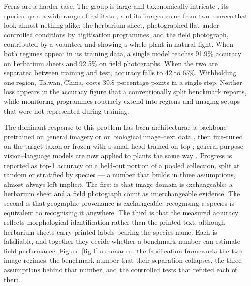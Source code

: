 \documentclass[preprint,12pt,authoryear]{elsarticle}
\begin{document}
Ferns are a harder case. The group is large and taxonomically intricate \citep{ppgi2016}, its species span a wide range of habitats \citep{page2002}, and its images come from two sources that look almost nothing alike: the herbarium sheet, photographed flat under controlled conditions by digitisation programmes, and the field photograph, contributed by a volunteer and showing a whole plant in natural light. When both regimes appear in its training data, a single model reaches 91.9\% accuracy on herbarium sheets and 92.5\% on field photographs. When the two are separated between training and test, accuracy falls to 42 to 65\%. Withholding one region, Taiwan, China, costs 39.8 percentage points in a single step. Neither loss appears in the accuracy figure that a conventionally split benchmark reports, while monitoring programmes routinely extend into regions and imaging setups that were not represented during training.

The dominant response to this problem has been architectural: a backbone pretrained on general imagery \citep{radford2021,ilharco2021} or on biological image--text data \citep{stevens2024,gu2025}, then fine-tuned on the target taxon \citep{kumar2012,joly2014,goeau2017} or frozen with a small head trained on top \citep{oquab2024}; general-purpose vision--language models are now applied to plants the same way \citep{bai2025}. Progress is reported as top-1 accuracy on a held-out portion of a pooled collection, split at random or stratified by species \citep{vanhorn2018} --- a number that builds in three assumptions, almost always left implicit. The first is that image domain is exchangeable: a herbarium sheet and a field photograph count as interchangeable evidence. The second is that geographic provenance is exchangeable: recognising a species is equivalent to recognising it anywhere. The third is that the measured accuracy reflects morphological identification rather than the printed text, although herbarium sheets carry printed labels bearing the species name. Each is falsifiable, and together they decide whether a benchmark number can estimate field performance. Figure~\ref{fig:1} summarises the falsification framework: the two image regimes, the benchmark number that their separation collapses, the three assumptions behind that number, and the controlled tests that refuted each of them.
\end{document}
